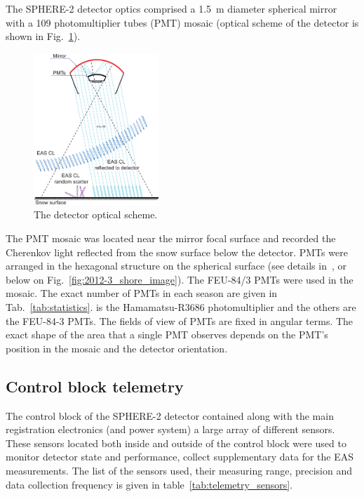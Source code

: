 \documentclass[final,5p,times,twocolumn]{elsarticle}
\begin{document}
The \mbox{SPHERE-2} detector optics comprised a 1.5~m diameter spherical mirror with a 109 photomultiplier tubes (PMT) mosaic (optical scheme of the detector is shown in Fig.~\ref{fig:optics}).

\begin{figure}[bt]
\centering
    \includegraphics[width=0.42\textwidth]{optics.eps}
    \caption{The detector optical scheme.}
\label{fig:optics}
\end{figure}

The PMT mosaic was located near the mirror focal surface and recorded the Cherenkov light reflected from the snow surface below the detector. PMTs were arranged in the hexagonal structure on the spherical surface (see details in~\cite{Ant20}, or below on Fig.~\ref{fig:2012-3_shore_image}). The FEU-84/3 PMTs were used in the mosaic. The exact number of PMTs in each season are given in Tab.~\ref{tab:statistics}. is the Hamamatsu-R3686 photomultiplier and the others are the FEU-84-3 PMTs. The fields of view of PMTs are fixed in angular terms. The exact shape of the area that a single PMT observes depends on the PMT's position in the mosaic and the detector orientation.


\subsection{Control block telemetry}

The control block of the SPHERE-2 detector contained along with the main registration electronics (and power system) a large array of different sensors. These sensors located both inside and outside of the control block were used to monitor detector state and performance, collect supplementary data for the EAS measurements. The list of the sensors used, their measuring range, precision and data collection frequency is given in table~\ref{tab:telemetry_sensors}. 
\end{document}

